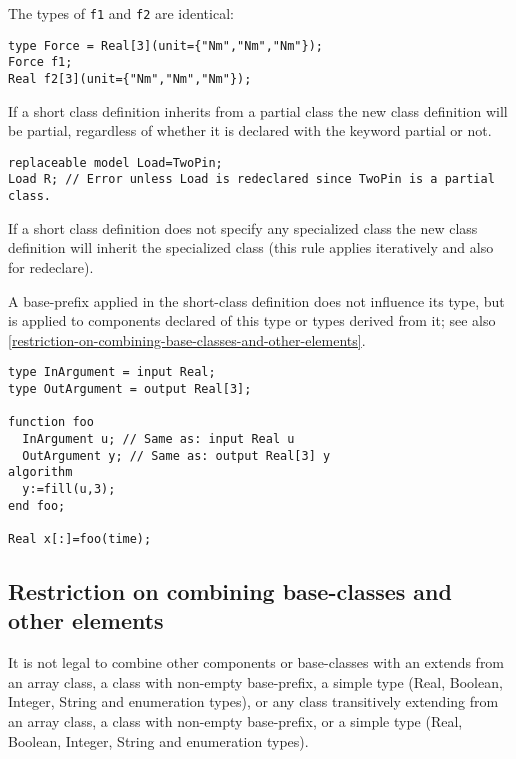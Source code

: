 \begin{example}
The types of \lstinline!f1! and \lstinline!f2! are identical:
\begin{lstlisting}[language=modelica]
type Force = Real[3](unit={"Nm","Nm","Nm"});
Force f1;
Real f2[3](unit={"Nm","Nm","Nm"});
\end{lstlisting}
\end{example}

If a short class definition inherits from a partial class the new class
definition will be partial, regardless of whether it is declared with
the keyword partial or not.

\begin{example}
\begin{lstlisting}[language=modelica]
replaceable model Load=TwoPin;
Load R; // Error unless Load is redeclared since TwoPin is a partial class.
\end{lstlisting}
\end{example}

If a short class definition does not specify any specialized class the
new class definition will inherit the specialized class (this rule
applies iteratively and also for redeclare).

A base-prefix applied in the short-class definition does not influence
its type, but is applied to components declared of this type or types
derived from it; see also \autoref{restriction-on-combining-base-classes-and-other-elements}.

\begin{example}
\begin{lstlisting}[language=modelica]
type InArgument = input Real;
type OutArgument = output Real[3];

function foo
  InArgument u; // Same as: input Real u
  OutArgument y; // Same as: output Real[3] y
algorithm
  y:=fill(u,3);
end foo;

Real x[:]=foo(time);
\end{lstlisting}
\end{example}

\subsection{Restriction on combining base-classes and other elements}

It is not legal to combine other components or base-classes with an
extends from an array class, a class with non-empty base-prefix, a
simple type (Real, Boolean, Integer, String and enumeration types), or
any class transitively extending from an array class, a class with
non-empty base-prefix, or a simple type (Real, Boolean, Integer, String
and enumeration types).

